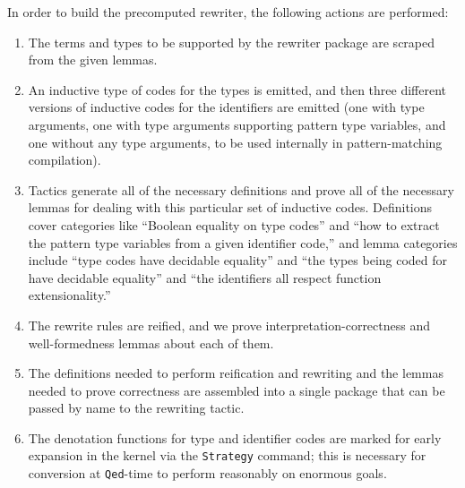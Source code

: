 \documentclass[a4paper,USenglish,cleveref,autoref,thm-restate]{lipics-v2021}
\begin{document}
In order to build the precomputed rewriter, the following actions are performed:
\begin{enumerate}
    \item
    The terms and types to be supported by the rewriter package are scraped from the given lemmas.
    \item
    An inductive type of codes for the types is emitted, and then three different versions of inductive codes for the identifiers are emitted (one with type arguments, one with type arguments supporting pattern type variables, and one without any type arguments, to be used internally in pattern-matching compilation).
    \item
    Tactics generate all of the necessary definitions and prove all of the necessary lemmas for dealing with this particular set of inductive codes.
    Definitions cover categories like ``Boolean equality on type codes'' and ``how to extract the pattern type variables from a given identifier code,'' and lemma categories include ``type codes have decidable equality'' and ``the types being coded for have decidable equality'' and ``the identifiers all respect function extensionality.''
    \item
    The rewrite rules are reified, and we prove interpretation-correctness and well-formedness lemmas about each of them.
    \item
    The definitions needed to perform reification and rewriting and the lemmas needed to prove correctness are assembled into a single package that can be passed by name to the rewriting tactic.
    \item
    The denotation functions for type and identifier codes are marked for early expansion in the kernel via the \texttt{Strategy} command;
    this is necessary for conversion at \texttt{Qed}-time to perform reasonably on enormous goals.
\end{enumerate}
\end{document}
